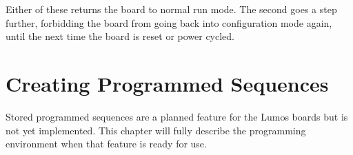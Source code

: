 \documentclass[letterpaper,twoside,onecolumn,openright,final]{memoir}
\begin{document}
Either of these returns the board to normal run mode.  The second goes a step further, forbidding
the board from going back into configuration mode again, until the next time the board is reset or
power cycled.

\chapter{Creating Programmed Sequences}\label{ch:sequences}
\begin{NotImplemented*}{Stored programmed sequences are a planned feature for the Lumos boards but is not
yet implemented.  This chapter will fully describe the programming environment when that feature is
ready for use.}

\bigskip


\end{NotImplemented*}
\end{document}
